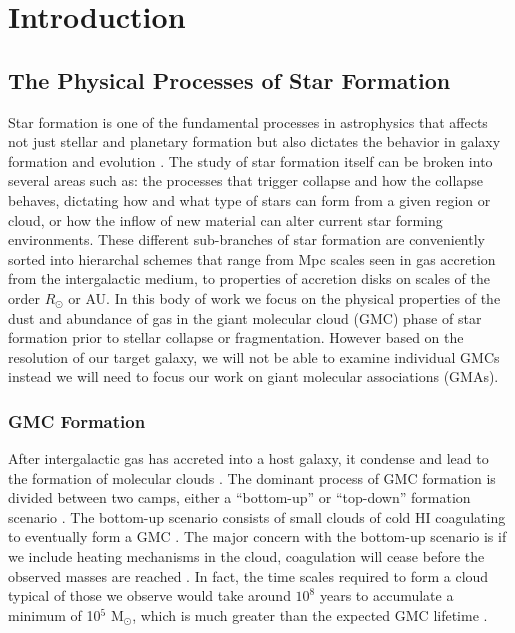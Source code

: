 \chapter{Introduction}\label{intro}

\section{The Physical Processes of Star Formation} %

Star formation is one of the fundamental processes in astrophysics that affects not just stellar and planetary formation but also dictates the behavior in galaxy formation and evolution \citep{kennicutt2012}.  The study of star formation itself can be broken into several areas such as: the processes that trigger collapse and how the collapse behaves, dictating how and what type of stars can form from a given region or cloud, or how the inflow of new material can alter current star forming environments.  These different sub-branches of star formation are conveniently sorted into hierarchal schemes that range from Mpc scales seen in gas accretion from the intergalactic medium, to properties of accretion disks on scales of the order $R_\odot$ or AU\citep{kennicutt2012}.  In this body of work we focus on the physical properties of the dust and abundance of gas in the giant molecular cloud (GMC) phase of star formation prior to stellar collapse or fragmentation.  However based on the resolution of our target galaxy, we will not be able to examine individual GMCs instead we will need to focus our work on giant molecular associations (GMAs).

\subsection{GMC Formation}

After intergalactic gas has accreted into a host galaxy, it condense and lead to the formation of molecular clouds \citep{kennicutt2012}.  The dominant process of GMC formation is divided between two camps, either a ``bottom-up'' or ``top-down'' formation scenario \citep{mckee2007}.  The bottom-up scenario consists of small clouds of cold HI coagulating to eventually form a GMC \citep{field1965, kwan1979}.  The major concern with the bottom-up scenario is if we include heating mechanisms in the cloud, coagulation will cease before the observed masses are reached \citep{mckee2007}.  In fact, the time scales required to form a cloud typical of those we observe would take around $10^8$ years to accumulate a minimum of 10$^5$ M$_\odot$, which is much greater than the expected GMC lifetime \citep{mckee2007}.  %

